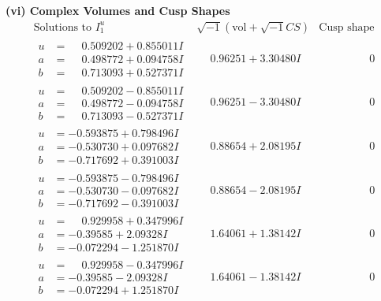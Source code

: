 \documentclass[1p]{elsarticle_modified}
\theoremstyle{definition}
\newcommand{\I}{\sqrt{-1}}
\begin{document}
\newpage\flushleft \textbf{(vi) Complex Volumes and Cusp Shapes}
$$\begin{array}{c|c|c}  
\text{Solutions to }I^u_{1}& \I (\text{vol} + \sqrt{-1}CS) & \text{Cusp shape}\\
 \hline 
\begin{aligned}
u &= \phantom{-}0.509202 + 0.855011 I \\
a &= \phantom{-}0.498772 + 0.094758 I \\
b &= \phantom{-}0.713093 + 0.527371 I\end{aligned}
 & \phantom{-}0.96251 + 3.30480 I & \phantom{-0.000000 } 0 \\ \hline\begin{aligned}
u &= \phantom{-}0.509202 - 0.855011 I \\
a &= \phantom{-}0.498772 - 0.094758 I \\
b &= \phantom{-}0.713093 - 0.527371 I\end{aligned}
 & \phantom{-}0.96251 - 3.30480 I & \phantom{-0.000000 } 0 \\ \hline\begin{aligned}
u &= -0.593875 + 0.798496 I \\
a &= -0.530730 + 0.097682 I \\
b &= -0.717692 + 0.391003 I\end{aligned}
 & \phantom{-}0.88654 + 2.08195 I & \phantom{-0.000000 } 0 \\ \hline\begin{aligned}
u &= -0.593875 - 0.798496 I \\
a &= -0.530730 - 0.097682 I \\
b &= -0.717692 - 0.391003 I\end{aligned}
 & \phantom{-}0.88654 - 2.08195 I & \phantom{-0.000000 } 0 \\ \hline\begin{aligned}
u &= \phantom{-}0.929958 + 0.347996 I \\
a &= -0.39585 + 2.09328 I \\
b &= -0.072294 - 1.251870 I\end{aligned}
 & \phantom{-}1.64061 + 1.38142 I & \phantom{-0.000000 } 0 \\ \hline\begin{aligned}
u &= \phantom{-}0.929958 - 0.347996 I \\
a &= -0.39585 - 2.09328 I \\
b &= -0.072294 + 1.251870 I\end{aligned}
 & \phantom{-}1.64061 - 1.38142 I & \phantom{-0.000000 } 0 \\ \hline\begin{aligned}

\end{aligned}
\end{array}$$
\end{document}
